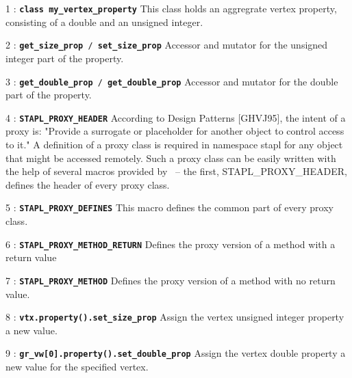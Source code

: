 \documentclass{report}
\begin{document}
\begin{hashitemize}
\item 1 : \texttt{{\bf class my\_vertex\_property}}
\newline
This class holds an aggregrate vertex property, consisting of a double
and an unsigned integer.

\item 2 : \texttt{{\bf get\_size\_prop} / {\bf set\_size\_prop}}
\newline
Accessor and mutator for the unsigned integer part of the property.

\item 3 : \texttt{{\bf get\_double\_prop} / {\bf get\_double\_prop}}
\newline
Accessor and mutator for the double part of the property.

\item 4 : \texttt{{\bf STAPL\_PROXY\_HEADER}}
\newline
According to Design Patterns [GHVJ95], the intent of a proxy is:
"Provide a surrogate or placeholder for another object to control
access to it." 
A definition of a proxy class is required in namespace stapl for any
object that might be accessed remotely. Such a proxy class can be easily written
with the help of several macros provided by \stapl\ -- the first,
STAPL\_PROXY\_HEADER, defines the header of every proxy class. 

\item 5 : \texttt{{\bf STAPL\_PROXY\_DEFINES}}
\newline
This macro defines the common part of every proxy class.

\item 6 : \texttt{{\bf STAPL\_PROXY\_METHOD\_RETURN}}
\newline
Defines the proxy version of a method with a return value

\item 7 : \texttt{{\bf STAPL\_PROXY\_METHOD}}
\newline
Defines the proxy version of a method with no return value.

\item 8 : \texttt{{\bf vtx.property().set\_size\_prop}}
\newline
Assign the vertex unsigned integer property a new value.

\item 9 : \texttt{{\bf gr\_vw[0].property().set\_double\_prop}}
\newline
Assign the vertex double property a new value for the specified vertex.


\end{hashitemize}
\end{document}
